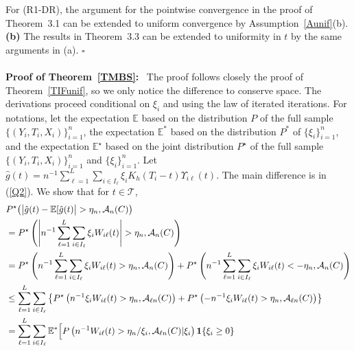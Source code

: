 \documentclass[lettersize, 12pt]{article}
\begin{document}
{For (R1-DR), the argument for the pointwise convergence in the proof of Theorem~3.1 can be extended to uniform convergence by Assumption~\ref{Aunif}(b). 
\\[5pt]
\textbf{(b)} The results in Theorem~3.3 can be extended to uniformity in $t$ by the same arguments in (a).
\hfill $\square$
\\
\\
\textbf{Proof of Theorem~\ref{TMBS}:}\
The proof follows closely the proof of Theorem~\ref{TIFunif}, so we only notice the difference to conserve space.
The derivations proceed conditional on $\xi_i$ and using the law of iterated iterations.  
For notations, let 
the expectation $\mathbb{E}$ based on the distribution $P$ of the full sample $\{(Y_i, T_i, X_i)\}_{i=1}^n$,
the expectation $\mathbb{E}^\ast$ based on the distribution $P^\ast$ of 
$\{\xi_i\}_{i=1}^n$, and
the expectation $\mathbb{E}^\star$ based on the joint distribution $P^\star$ of the full sample $\{(Y_i, T_i, X_i)\}_{i=1}^n$
and $\{\xi_i\}_{i=1}^n$.
Let $\hat g(t) = n^{-1}\sum_{\ell = 1}^L \sum_{i \in I_\ell} \xi_i K_h(T_i-t) \Upsilon_{i\ell}(t)$.
The main difference is in (\ref{Q2}).
We show that 
for $t \in\mathcal{T}$,
\begin{align*}
&P^\star\big( \big| \hat g(t) - \mathbb{E}[\hat g(t) \big| > \eta_n, \mathcal{A}_n(C) \big) 
\\
& = P^\star\left( \left| n^{-1}\sum_{\ell = 1}^L \sum_{i \in I_\ell} \xi_iW_{i\ell}(t) \right| > \eta_n, \mathcal{A}_n(C)\right)
\\
& = P^\star\left(  n^{-1}\sum_{\ell = 1}^L \sum_{i \in I_\ell} \xi_i W_{i\ell}(t)  > \eta_n, \mathcal{A}_n(C)\right)
+ P^\star\left(  n^{-1}\sum_{\ell = 1}^L \sum_{i \in I_\ell}\xi_i W_{i\ell}(t)  < - \eta_n, \mathcal{A}_n(C)\right)
\\
& \leq \sum_{\ell = 1}^L \sum_{i \in I_\ell} \left\{ P^\star\left(  n^{-1}\xi_iW_{i\ell}(t)  > \eta_n, \mathcal{A}_{\ell n}(C)\right)
+ P^\star\left(  - n^{-1} \xi_i W_{i\ell}(t)  >  \eta_n, \mathcal{A}_{\ell n}(C)\right)\right\}
\\
& =  \sum_{\ell = 1}^L \sum_{i \in I_\ell}   \mathbb{E}^\ast\Big[ P\left(n^{-1}W_{i\ell}(t)  > \eta_n/\xi_i, \mathcal{A}_{\ell n}(C)|\xi_i\right){\bf 1}\{\xi_i \geq 0\}\\

\end{align*}}
\end{document}
